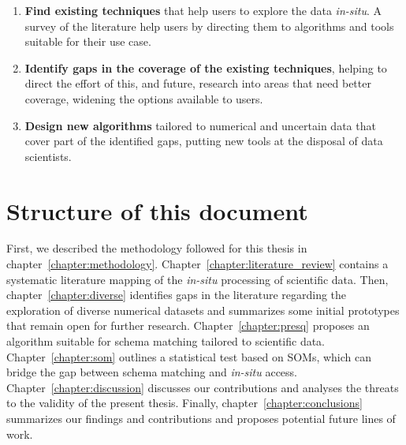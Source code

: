 \begin{enumerate}
    \item \textbf{Find existing techniques} that help users
        to  explore the data \emph{in-situ}. A survey of the 
        literature help users by directing them to algorithms
        and tools suitable for their use case.
        
    \item \textbf{Identify gaps in the coverage of the existing
        techniques}, helping to direct the effort of this,
        and future, research into areas that need better
        coverage, widening the options available to users.

    \item \textbf{Design new algorithms} tailored to numerical 
    and uncertain data that cover part of the identified gaps,
    putting new tools at the disposal of data scientists.
\end{enumerate}
\label{enum:objectives}

\section{Structure of this document}

First, we described the methodology followed for this thesis in chapter~\ref{chapter:methodology}.
Chapter~\ref{chapter:literature_review} contains a systematic literature mapping
of the \emph{in-situ} processing of scientific data.
Then, chapter~\ref{chapter:diverse} identifies gaps in the literature regarding
the exploration of diverse numerical datasets and summarizes some initial prototypes
that remain open for further research.
Chapter~\ref{chapter:presq} proposes an algorithm suitable for schema matching
tailored to scientific data. Chapter~\ref{chapter:som} outlines a statistical
test based on \glspl{SOM}, which can bridge the gap between schema matching and
\emph{in-situ} access.
Chapter~\ref{chapter:discussion} discusses our contributions
and analyses the threats to the validity of the present thesis.
Finally, chapter~\ref{chapter:conclusions} summarizes our findings and contributions and proposes potential future lines of work.
